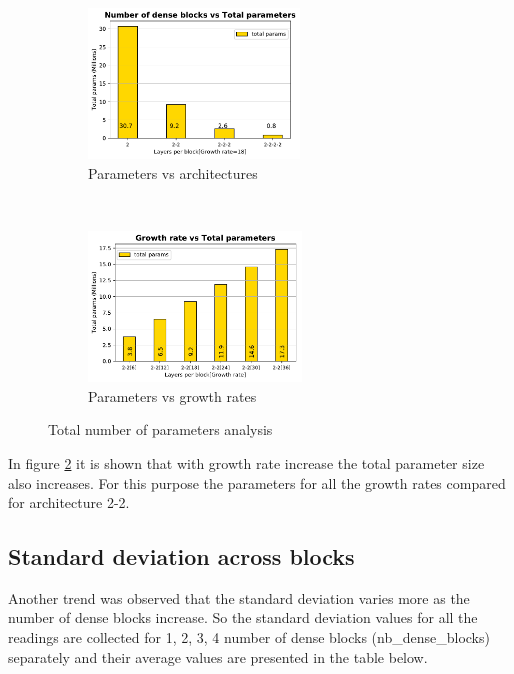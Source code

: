 \begin{figure}[ht]
    \centering
    \begin{subfigure}[b]{0.4\textwidth}
        \includegraphics[height=4cm]{images/densenet/siamese/densenet_siamese_blocks_params_bar}
        \caption{Parameters vs architectures}
        \label{fig:Denseblocks_vs_parameters}
    \end{subfigure}
    ~ %
    \begin{subfigure}[b]{0.4\textwidth}
        \includegraphics[height=4cm]{images/densenet/siamese/densenet_siamese_gr_params_bar}
        \caption{Parameters vs growth rates}
        \label{fig:growthrate_vs_parameters}
    \end{subfigure}    
    \caption{Total number of parameters analysis}
    \label{fig:total_parameters_densenet}
\end{figure}

In figure \ref{fig:growthrate_vs_parameters} it is shown that with growth rate increase the total parameter size also increases. For this purpose the parameters for all the growth rates compared for architecture 2-2.

\subsection{Standard deviation across blocks}
Another trend was observed that the standard deviation varies more as the number of dense blocks increase. 
So the standard deviation values for all the readings are collected for 1, 2, 3, 4 number of dense blocks (nb\_dense\_blocks) separately and their average values are presented in the table below.

